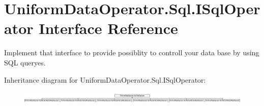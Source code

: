 \hypertarget{interface_uniform_data_operator_1_1_sql_1_1_i_sql_operator}{}\section{Uniform\+Data\+Operator.\+Sql.\+I\+Sql\+Operator Interface Reference}
\label{interface_uniform_data_operator_1_1_sql_1_1_i_sql_operator}


Implement that interface to provide possiblity to controll your data base by using S\+QL queryes.  


Inheritance diagram for Uniform\+Data\+Operator.\+Sql.\+I\+Sql\+Operator\+:\begin{figure}[H]
\begin{center}
\leavevmode
\includegraphics[height=0.590717cm]{d1/dad/interface_uniform_data_operator_1_1_sql_1_1_i_sql_operator}
\end{center}
\end{figure}
